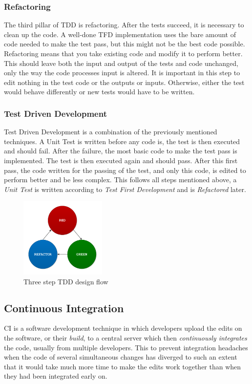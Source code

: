 \documentclass[11pt,british]{article}
\begin{document}
\subsubsection{Refactoring}
The third pillar of TDD is refactoring. After the tests succeed, it is necessary to clean up the code.\cite{refactoring} A well-done \gls{TFD} implementation uses the bare amount of code needed to make the test pass, but this might not be the best code possible. Refactoring means that you take existing code and modify it to perform better. This should leave both the input and output of the tests and code unchanged, only the way the code processes input is altered. It is important in this step to edit nothing in the test code or the outputs or inputs. Otherwise, either the test would behave differently or new tests would have to be written. 

\subsubsection{Test Driven Development}
Test Driven Development is a combination of the previously mentioned techniques. A Unit Test is written before any code is, the test is then executed and should fail. After the failure, the most basic code to make the test pass is implemented. The test is then executed again and should pass. After this first pass, the code written for the passing of the test, and only this code, is edited to perform better and be less complex. This follows all steps mentioned above, a \emph{Unit Test} is written according to \emph{Test First Development} and is \emph{Refactored} later.

\begin{figure}[h]
    \centering
	\includegraphics[width=0.38\textwidth]{images/tdd.pdf}
    \caption{Three step TDD design flow}
    \label{fig:TDD_Flow}
\end{figure}

\subsection{Continuous Integration}
\label{subsec:CI}
\gls{CI} is a software development technique in which developers upload the edits on the software, or their \emph{build}, to a central server which then \emph{continuously integrates} the code, usually from multiple developers. This to prevent integration headaches when the code of several simultaneous changes has diverged to such an extent that it would take much more time to make the edits work together than when they had been integrated early on.
\end{document}
